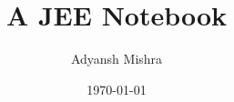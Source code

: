 \documentclass[twoside, a4paper, 10pt, bibliography=totoc, index=totoc, listof=totoc]{scrbook}
\begin{document}
    \author{Adyansh Mishra}
    \date{\today}
    \title{A JEE Notebook}
    \fncytitle

    \tableofcontents
     
    \frontmatter
    
    
    \mainmatter
    
\end{document}
